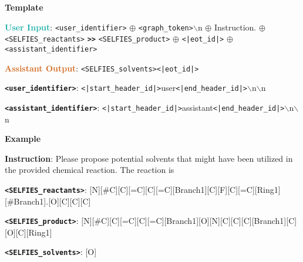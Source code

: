 \begin{tcolorbox}[colback=white!98!black,colframe=white!30!black,boxsep=1.1pt,top=6.75pt]%
\scriptsize
\noindent\makebox[\textwidth]{\rule{\textwidth}{1pt}}
\textbf{Template}
\\[-0.575em]
\noindent\makebox[\textwidth]{\rule{\textwidth}{1pt}}

\textbf{\textcolor[HTML]{20B2AA}{User Input}}: {\tt <user\_identifier>} $\oplus$ {\tt <graph\_token>}$\backslash$n $\oplus$ Instruction. $\oplus$ {\tt <SELFIES\_reactants>} {\tt \textbf{>>}} {\tt <SELFIES\_product>} $\oplus$ {\tt <|eot\_id|>} $\oplus$ {\tt <assistant\_identifier>}

\textbf{\textcolor[HTML]{D2691E}{Assistant Output}}: {\tt <SELFIES\_solvents>}{\tt <|eot\_id|>}

{\tt \textbf{<user\_identifier>}}: {\tt <|start\_header\_id|>}user{\tt <|end\_header\_id|>}$\backslash$n$\backslash$n

{\tt \textbf{<assistant\_identifier>}}: {\tt <|start\_header\_id|>}assistant{\tt <|end\_header\_id|>}$\backslash$n$\backslash$n

\noindent\makebox[\textwidth]{\rule{\textwidth}{1pt}}
\textbf{Example}
\\[-0.575em]
\noindent\makebox[\textwidth]{\rule{\textwidth}{1pt}}

\begin{tcolorbox}[colback=cyan!7!white,colframe=white!98!black,boxsep=1.1pt,top=6.75pt]
\textbf{Instruction}: Please propose potential solvents that might have been utilized in the provided chemical reaction. The reaction is

{\tt \textbf{<SELFIES\_reactants>}}: 
[N][\#C][C][=C][C][=C][Branch1][C][F][C][=C][Ring1][\#Branch1].[O][C][C][C]\-[N][C][Ring1][Branch1]

{\tt \textbf{<SELFIES\_product>}}: 
[N][\#C][C][=C][C][=C][Branch1][O][N][C][C][C][Branch1][C][O][C][Ring1]\-[=Branch1][C][=C][Ring1][N]
\end{tcolorbox}

\begin{tcolorbox}[colback=orange!7!white,colframe=white!98!black,boxsep=1.1pt,top=6.75pt]
{\tt \textbf{<SELFIES\_solvents>}}: [O]
\end{tcolorbox}

\end{tcolorbox}

